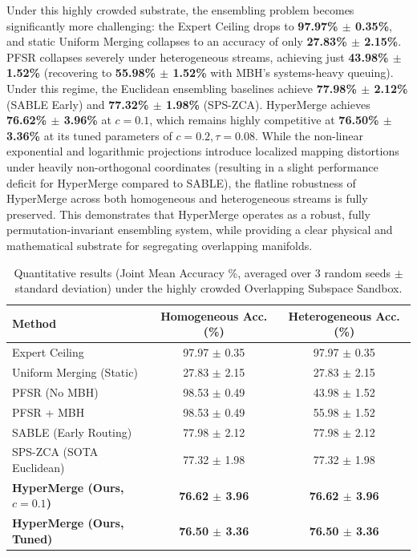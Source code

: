 Under this highly crowded substrate, the ensembling problem becomes significantly more challenging: the Expert Ceiling drops to \textbf{97.97\% $\pm$ 0.35\%}, and static Uniform Merging collapses to an accuracy of only \textbf{27.83\% $\pm$ 2.15\%}. PFSR collapses severely under heterogeneous streams, achieving just \textbf{43.98\% $\pm$ 1.52\%} (recovering to \textbf{55.98\% $\pm$ 1.52\%} with MBH's systems-heavy queuing). Under this regime, the Euclidean ensembling baselines achieve \textbf{77.98\% $\pm$ 2.12\%} (SABLE Early) and \textbf{77.32\% $\pm$ 1.98\%} (SPS-ZCA). HyperMerge achieves \textbf{76.62\% $\pm$ 3.96\%} at $c=0.1$, which remains highly competitive at \textbf{76.50\% $\pm$ 3.36\%} at its tuned parameters of $c=0.2, \tau=0.08$. While the non-linear exponential and logarithmic projections introduce localized mapping distortions under heavily non-orthogonal coordinates (resulting in a slight performance deficit for HyperMerge compared to SABLE), the flatline robustness of HyperMerge across both homogeneous and heterogeneous streams is fully preserved. This demonstrates that HyperMerge operates as a robust, fully permutation-invariant ensembling system, while providing a clear physical and mathematical substrate for segregating overlapping manifolds.

\begin{table}[h]
\caption{Quantitative results (Joint Mean Accuracy \%, averaged over 3 random seeds $\pm$ standard deviation) under the highly crowded Overlapping Subspace Sandbox.}
\label{tab:overlapping_results}
\vskip 0.1in
\begin{center}
\begin{small}
\begin{sc}
\begin{tabular}{lcc}
\toprule
Method & Homogeneous Acc. (\%) & Heterogeneous Acc. (\%) \\
\midrule
Expert Ceiling & 97.97 $\pm$ 0.35 & 97.97 $\pm$ 0.35 \\
Uniform Merging (Static) & 27.83 $\pm$ 2.15 & 27.83 $\pm$ 2.15 \\
PFSR (No MBH) & 98.53 $\pm$ 0.49 & 43.98 $\pm$ 1.52 \\
PFSR + MBH & 98.53 $\pm$ 0.49 & 55.98 $\pm$ 1.52 \\
SABLE (Early Routing) & 77.98 $\pm$ 2.12 & 77.98 $\pm$ 2.12 \\
SPS-ZCA (SOTA Euclidean) & 77.32 $\pm$ 1.98 & 77.32 $\pm$ 1.98 \\
\midrule
\textbf{HyperMerge (Ours, $c=0.1$)} & \textbf{76.62 $\pm$ 3.96} & \textbf{76.62 $\pm$ 3.96} \\
\textbf{HyperMerge (Ours, Tuned)} & \textbf{76.50 $\pm$ 3.36} & \textbf{76.50 $\pm$ 3.36} \\
\bottomrule
\end{tabular}
\end{sc}
\end{small}
\end{center}
\vskip -0.1in
\end{table}

